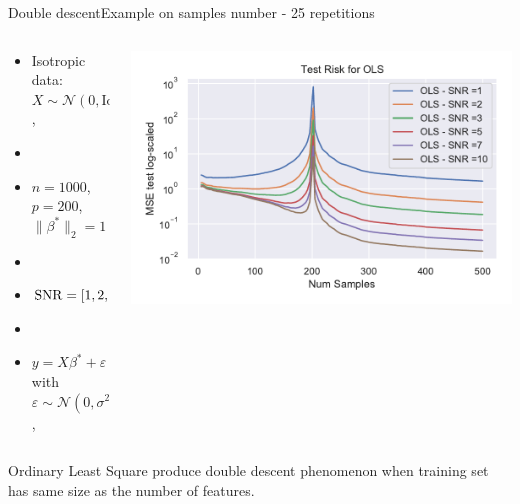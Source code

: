 \documentclass[10pt,aspectratio=43]{beamer}
\begin{document}
\begin{frame}{Double descent}{Example on samples number - 25 repetitions}
    \begin{columns}
        \begin{column}{0.46\textwidth}
            \begin{itemize}
                \item Isotropic data: $X\sim\mathcal{N}(0,\mathrm{Id})$,
                \item[]
                \item $n=1000$, $p=200$, $\|\beta^*\|_2=1$
                \item[]
                \item $\operatorname{SNR} = [1, 2, 3, 5, 7, 10]$ \\
                \item[]
                \item $y = X\beta^*+\varepsilon$ with $\varepsilon\sim \mathcal{N}(0, \sigma^2\mathrm{Id})$,
            \end{itemize}
        \end{column}
        \begin{column}{0.7\textwidth}
            \begin{center}
             \includegraphics[width=1\textwidth]{ols_fail_log_snr.pdf}
             \end{center}
        \end{column}
        \end{columns}
        \begin{block}{}
            Ordinary Least Square produce double descent phenomenon when training set has same size as the number of features.
        \end{block}
\end{frame}
\end{document}
